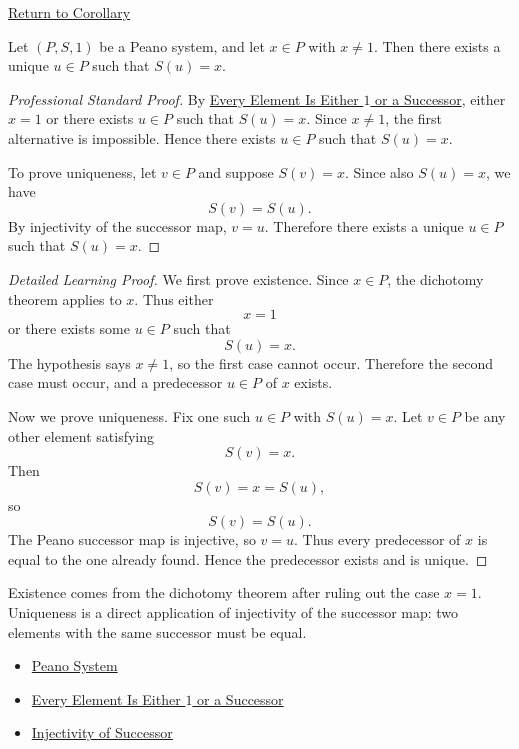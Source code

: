 \newpage
{}
\label{prf:predecessor-exists-unique-away-from-one}

\begin{remark*}[Return]
\hyperref[cor:predecessor-exists-unique-away-from-one]{Return to Corollary}
\end{remark*}

\begin{corollary*}
Let $(P,S,1)$ be a Peano system, and let $x \in P$ with $x \neq 1$. Then
there exists a unique $u \in P$ such that $S(u)=x$.
\end{corollary*}

\begin{proof}[Professional Standard Proof]
\LRAProofBodyStart
By
\hyperref[thm:every-element-is-one-or-a-successor]{Every Element Is Either
$1$ or a Successor}, either $x=1$ or there exists $u\in P$ such that
$S(u)=x$. Since $x\neq 1$, the first alternative is impossible. Hence there
exists $u\in P$ such that $S(u)=x$.

To prove uniqueness, let $v\in P$ and suppose $S(v)=x$. Since also $S(u)=x$,
we have
\[
S(v)=S(u).
\]
By injectivity of the successor map, $v=u$. Therefore there exists a unique
$u\in P$ such that $S(u)=x$.
\end{proof}

\begin{proof}[Detailed Learning Proof]
\LRAProofBodyStart
We first prove existence. Since $x\in P$, the dichotomy theorem applies to
$x$. Thus either
\[
x=1
\]
or there exists some $u\in P$ such that
\[
S(u)=x.
\]
The hypothesis says $x\neq 1$, so the first case cannot occur. Therefore the
second case must occur, and a predecessor $u\in P$ of $x$ exists.

Now we prove uniqueness. Fix one such $u\in P$ with $S(u)=x$. Let
$v\in P$ be any other element satisfying
\[
S(v)=x.
\]
Then
\[
S(v)=x=S(u),
\]
so
\[
S(v)=S(u).
\]
The Peano successor map is injective, so $v=u$. Thus every predecessor of
$x$ is equal to the one already found. Hence the predecessor exists and is
unique.
\end{proof}

\begin{remark*}
Existence comes from the dichotomy theorem after ruling out the case $x=1$.
Uniqueness is a direct application of injectivity of the successor map: two
elements with the same successor must be equal.
\end{remark*}

\begin{dependencies}
\begin{itemize}
  \item \hyperref[def:peano-system]{Peano System}
  \item \hyperref[thm:every-element-is-one-or-a-successor]{Every Element Is Either $1$ or a Successor}
  \item \hyperref[ax:peano-successor-injective]{Injectivity of Successor}
\end{itemize}
\end{dependencies}


\clearpage
